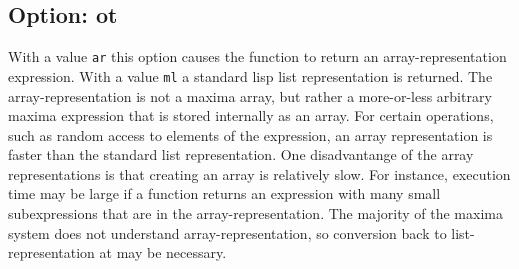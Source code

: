 \documentclass[]{article}
\begin{document}
\vspace{5 pt}


\subsection{Option: ot\label{sec:ot}}
\hypertarget{ot}{}



\vspace{5 pt}
With a value \verb#ar# this option causes the function to return an array-representation expression. With a value \verb#ml# a standard lisp list representation is returned. The array-representation is not a maxima array, but rather a more-or-less arbitrary maxima expression that is stored 
internally as an array. For certain operations, such as random access to elements of the expression, an array representation is faster than the standard list representation. One disadvantange of the array representations is that creating an array is relatively slow. For instance, execution time may 
be large if a function returns an expression with many small subexpressions that are in the array-representation. The majority of the maxima system does not understand array-representation, so conversion back to list-representation at may be necessary. 

\vspace{5 pt}
\end{document}
